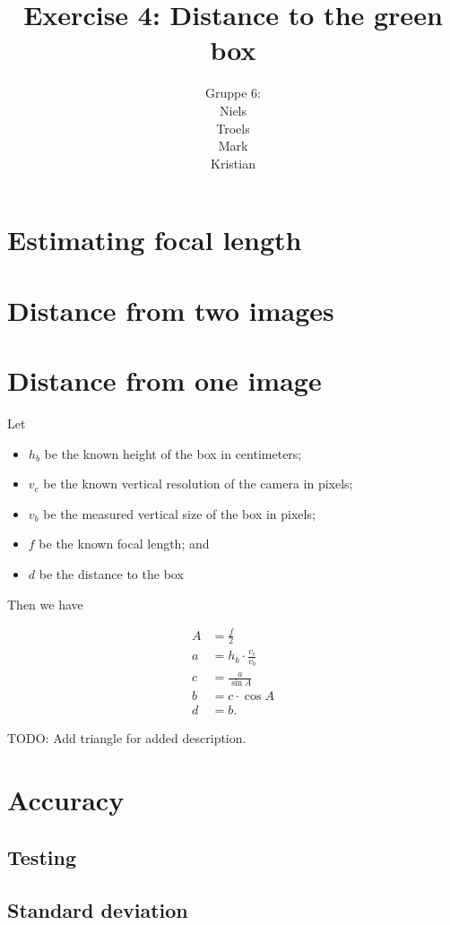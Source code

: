 \documentclass[a4paper,12pt]{article}
\title{Exercise 4: Distance to the green box}
\author{Gruppe 6:\\Niels\\Troels\\Mark\\Kristian}
\begin{document}
\maketitle

\section{Estimating focal length}

\section{Distance from two images}

\section{Distance from one image}

Let
\begin{itemize}
\item $h_b$ be the known height of the box in centimeters;
\item $v_c$ be the known vertical resolution of the camera in pixels;
\item $v_b$ be the measured vertical size of the box in pixels;
\item $f$ be the known focal length; and
\item $d$ be the distance to the box
\end{itemize}

Then we have

\begin{align*}
  A &= \frac{f}{2}\\
  a &= h_b \cdot \frac{v_c}{v_b}\\
  c &= \frac{a}{\sin A}\\
  b &= c \cdot \cos A\\
  d &= b.
\end{align*}

TODO: Add triangle for added description.

\section{Accuracy}

\subsection{Testing}

\subsection{Standard deviation}
\end{document}
